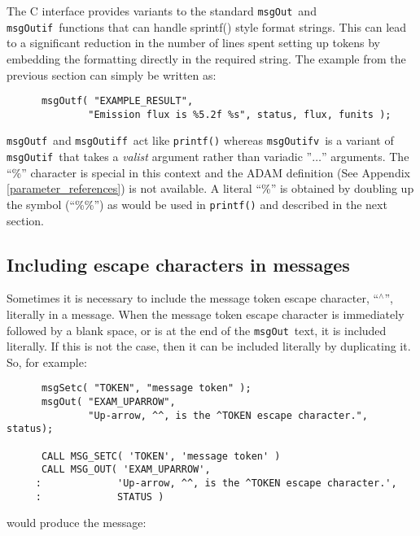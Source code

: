 \documentclass[twoside,11pt]{article}
\newcommand{\htmlref}[2]{#1}
\newcommand{\latex}[1]{#1}
\newcommand{\xlabel}[1]{}
\renewcommand{\_}{\texttt{\symbol{95}}}
\newcommand{\func}[1]{\texttt{#1}}
\newcommand{\farg}[1]{\textit{#1}}
\newcommand{\msgout}{\func{msgOut}}
\newcommand{\msgoutf}{\func{msgOutf}}
\newcommand{\msgoutif}{\func{msgOutif}}
\newcommand{\msgoutiff}{\func{msgOutiff}}
\newcommand{\msgoutifv}{\func{msgOutifv}}
\begin{document}
The C interface provides variants to the standard \msgout\ and
\msgoutif\ functions that can handle sprintf() style format
strings. This can lead to a significant reduction in the number of
lines spent setting up tokens by embedding the formatting directly
in the required string. The example from the previous section can
simply be written as:

\begin{small}
\begin{verbatim}
      msgOutf( "EXAMPLE_RESULT",
              "Emission flux is %5.2f %s", status, flux, funits );
\end{verbatim}
\end{small}

\msgoutf\ and \msgoutiff\ act like \func{printf()} whereas \msgoutifv\
is a variant of \msgoutif\ that takes a \farg{va\_list} argument rather
than variadic ''$\ldots$'' arguments. The ``\%'' character is special
in this context and the \htmlref{ADAM
definition}{parameter_references}
\latex{(See Appendix \ref{parameter_references})} is not available. A literal ``\%''
is obtained by doubling up the symbol (``\%\%'') as would be used in
\func{printf()} and described in the next section.

\subsection{\xlabel{including_escape_characters_in_messages}Including escape characters in messages}
Sometimes it is necessary to include the message token escape character,
``$^\wedge$'', literally in a message.
When the message token escape character is immediately followed by a blank
space, or is at the end of the \msgout\ text, it is included literally.
If this is not the case, then it can be included literally by duplicating it.
So, for example:

\begin {small}
\begin{verbatim}
      msgSetc( "TOKEN", "message token" );
      msgOut( "EXAM_UPARROW",
              "Up-arrow, ^^, is the ^TOKEN escape character.", status);

      CALL MSG_SETC( 'TOKEN', 'message token' )
      CALL MSG_OUT( 'EXAM_UPARROW',
     :             'Up-arrow, ^^, is the ^TOKEN escape character.',
     :             STATUS )
\end{verbatim}
\end {small}

would produce the message:
\end{document}
